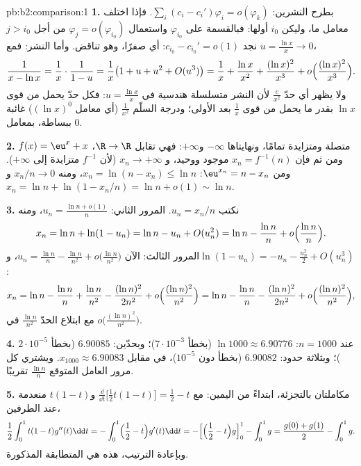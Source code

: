 \begin{solution}{pb:b2:comparison:1}
\textbf{1.} بطرح النشرين: $\sum_i (c_i -
c_i')\varphi_i = o(\varphi_k)$. فإذا اختلف معامل ما، وليكن
$i_0$ أولها: فبالقسمة على $\varphi_{i_0}$ واستعمال
$\varphi_j = o(\varphi_{i_0})$ من أجل $j > i_0$ نجد $c_{i_0} -
c_{i_0}' = o(1)$: أي صفرًا، وهو تناقض. وأما النشر: فمع
$u = \frac{\ln x}x \to 0$،
\[
\frac{1}{x - \ln x} = \frac1x\cdot\frac{1}{1 - u}
= \frac1x\bigl(1 + u + u^2 + O(u^3)\bigr)
= \frac1x + \frac{\ln x}{x^2} + \frac{(\ln x)^2}{x^3} +
o\Bigl(\frac{(\ln x)^2}{x^3}\Bigr).
\]
ولا يظهر أي حدّ $\frac c{x^2}$ لأن النشر متسلسلة
هندسية في $u = \frac{\ln x}{x}$: فكل حدّ يحمل من قوى
$\ln x$ بقدر ما يحمل من قوى $\frac1x$ بعد الأولى؛ ودرجة
السلّم $\frac1{x^2}$ (أي معامل $(\ln x)^0$) غائبة ببساطة،
بمعامل $0$.

\textbf{2.} $f(x) = \eu^x + x$ متصلة ومتزايدة
تمامًا، ونهايتاها $-\infty$ و$+\infty$: فهي تقابل
$\R \to \R$، ومن ثم فإن $x_n = f^{-1}(n)$ موجود ووحيد، و
$x_n \to +\infty$ (لأن $f^{-1}$ متزايدة إلى $+\infty$). ومن
$\eu^{x_n} = n - x_n$: $x_n = \ln(n - x_n) \leq \ln n$، ومنه
$x_n/n \to 0$ و$x_n = \ln n + \ln(1 - x_n/n) = \ln n + o(1)
\sim \ln n$.

\textbf{3.} نكتب $u_n = x_n/n$. المرور الثاني: $u_n = \frac{\ln n
+ o(1)}{n}$، ومنه
\[
x_n = \ln n + \ln(1 - u_n) = \ln n - u_n + O(u_n^2)
= \ln n - \frac{\ln n}{n} + o\Bigl(\frac{\ln n}n\Bigr).
\]
المرور الثالث: الآن $u_n = \frac{\ln n}{n} - \frac{\ln n}{n^2} +
o\bigl(\frac{\ln n}{n^2}\bigr)$، و$\ln(1 - u_n) = -u_n -
\frac{u_n^2}2 + O(u_n^3)$:
\[
x_n = \ln n - \frac{\ln n}n + \frac{\ln n}{n^2}
- \frac{(\ln n)^2}{2n^2} + o\Bigl(\frac{(\ln
n)^2}{n^2}\Bigr)
= \ln n - \frac{\ln n}{n} - \frac{(\ln n)^2}{2n^2} +
o\Bigl(\frac{(\ln n)^2}{n^2}\Bigr),
\]
مع ابتلاع الحدّ $\frac{\ln n}{n^2}$ في
$o\bigl(\frac{(\ln n)^2}{n^2}\bigr)$.

\textbf{4.} عند $n = 1000$: $\ln 1000 \approx 6.90776$ (بخطأ
$7\cdot10^{-3}$)؛ وبحدّين: $6.90085$ (بخطأ
$2\cdot10^{-5}$)؛ وبثلاثة حدود: $6.90082$ (بخطأ دون
$10^{-5}$)، في مقابل $x_{1000} \approx 6.90083$. ويشتري كل مرور
العامل المتوقع $\frac{\ln n}{n}$ تقريبًا.

\textbf{5.} مكاملتان بالتجزئة، ابتداءً من اليمين:
مع $\frac{\dd}{\dd t}\bigl[\tfrac12t(1-t)\bigr] = \tfrac12 -
t$ و$t(1-t)$ منعدمة عند الطرفين،
\[
\frac12\int_0^1 t(1-t)g''(t)\dd t
= -\int_0^1\Bigl(\frac12 - t\Bigr)g'(t)\dd t
= -\Bigl[\Bigl(\frac12 - t\Bigr)g\Bigr]_0^1 - \int_0^1 g
= \frac{g(0) + g(1)}2 - \int_0^1 g .
\]
وبإعادة الترتيب، هذه هي المتطابقة المذكورة.


\end{solution}

